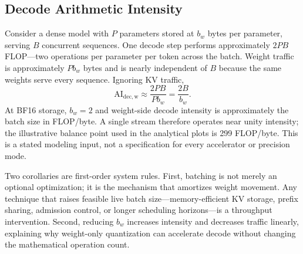 \documentclass[journal]{IEEEtran}
\newcommand{\AI}{\ensuremath{\mathrm{AI}}}
\begin{document}
\subsection{Decode Arithmetic Intensity}
Consider a dense model with $P$ parameters stored at $b_w$ bytes per parameter, serving $B$ concurrent sequences. One decode step performs approximately $2PB$ FLOP---two operations per parameter per token across the batch. Weight traffic is approximately $Pb_w$ bytes and is nearly independent of $B$ because the same weights serve every sequence. Ignoring KV traffic,
\begin{equation}
\AI_{\mathrm{dec,w}}\approx \frac{2PB}{Pb_w}=\frac{2B}{b_w}.
\label{eq:decode-ai}
\end{equation}
At BF16 storage, $b_w=2$ and weight-side decode intensity is approximately the batch size in FLOP/byte. A single stream therefore operates near unity intensity; the illustrative balance point used in the analytical plots is 299 FLOP/byte. This is a stated modeling input, not a specification for every accelerator or precision mode.

Two corollaries are first-order system rules. First, batching is not merely an optional optimization; it is the mechanism that amortizes weight movement. Any technique that raises feasible live batch size---memory-efficient KV storage, prefix sharing, admission control, or longer scheduling horizons---is a throughput intervention. Second, reducing $b_w$ increases intensity and decreases traffic linearly, explaining why weight-only quantization can accelerate decode without changing the mathematical operation count.
\end{document}
